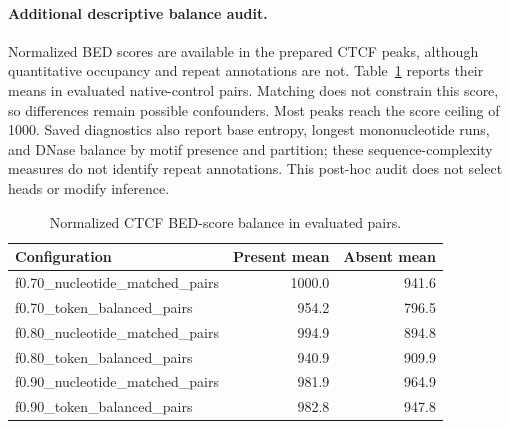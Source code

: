 \paragraph{Additional descriptive balance audit.}
Normalized BED scores are available in the prepared CTCF peaks, although quantitative occupancy and repeat annotations are not. Table~\ref{tab:bed-balance} reports their means in evaluated native-control pairs. Matching does not constrain this score, so differences remain possible confounders. Most peaks reach the score ceiling of 1000. Saved diagnostics also report base entropy, longest mononucleotide runs, and DNase balance by motif presence and partition; these sequence-complexity measures do not identify repeat annotations. This post-hoc audit does not select heads or modify inference.
\begin{table}[t]\centering\small\caption{Normalized CTCF BED-score balance in evaluated pairs.}\label{tab:bed-balance}
\begin{tabular}{lrr}\toprule Configuration & Present mean & Absent mean \\\midrule
f0.70\_nucleotide\_matched\_pairs & 1000.0 & 941.6 \\
f0.70\_token\_balanced\_pairs & 954.2 & 796.5 \\
f0.80\_nucleotide\_matched\_pairs & 994.9 & 894.8 \\
f0.80\_token\_balanced\_pairs & 940.9 & 909.9 \\
f0.90\_nucleotide\_matched\_pairs & 981.9 & 964.9 \\
f0.90\_token\_balanced\_pairs & 982.8 & 947.8 \\
\bottomrule\end{tabular}
\end{table}

